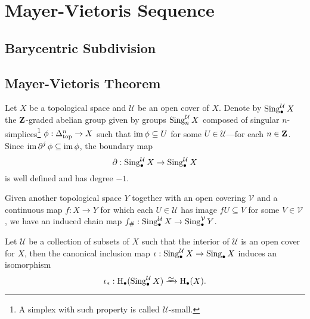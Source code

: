 \section{Mayer-Vietoris Sequence}

\subsection{Barycentric Subdivision}


\subsection{Mayer-Vietoris Theorem}

\begin{definition}
\label{def:cover-singular-simplicial-complex}
Let \(X\) be a topological space and \(\mathcal{U}\) be an open cover of \(X\). Denote by
\(\operatorname{Sing}_{\bullet}^{\mathcal{U}} X\) the \(\mathbf{Z}\)-graded abelian group given by groups
\(\operatorname{Sing}_n^{\mathcal{U}} X\) composed of singular \(n\)-simplices\footnote{A simplex with
  such property is called \(\mathcal{U}\)-small.} \(\phi: \Delta_{\text{top}}^n \to X\) such that
\(\operatorname{im} \phi \subseteq U\) for some \(U \in \mathcal{U}\)---for each \(n \in \mathbf{Z}\). Since
\(\operatorname{im} \operatorname{\partial}^j \phi \subseteq \operatorname{im} \phi\), the boundary map
\[
\operatorname{\partial}: \operatorname{Sing}_{\bullet}^{\mathcal{U}} X \to \operatorname{Sing}_{\bullet}^{\mathcal{U}} X
\]
is well defined and has degree \(-1\).

Given another topological space \(Y\) together with an open covering
\(\mathcal{V}\) and a continuous map \(f: X \to Y\) for which each
\(U \in \mathcal{U}\) has image \(f U \subseteq V\) for some
\(V \in \mathcal{V}\), we have an induced chain map
\(f_{\#}: \operatorname{Sing}_{\bullet}^{\mathcal{U}} X \to \operatorname{Sing}_{\bullet}^{\mathcal{V}} Y\).
\end{definition}

\begin{theorem}
\label{thm:iso-hmlg-groups-cover}
Let \(\mathcal{U}\) be a collection of subsets of \(X\) such that the interior of
\(\mathcal{U}\) is an open cover for \(X\), then the canonical inclusion map
\(\iota: \operatorname{Sing}_{\bullet}^{\mathcal{U}} X \to \operatorname{Sing}_{\bullet} X\) induces an isomorphism
\[
\iota_{*}: \Hmlg_{\bullet}(\Sing_{\bullet}^{\mathcal{U}} X) \isoto \Hmlg_{\bullet}(X).
\]
\end{theorem}


